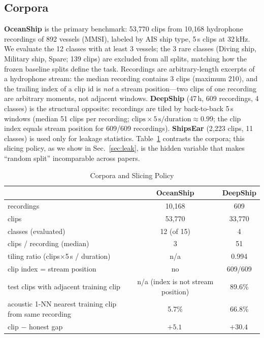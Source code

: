 ﻿\documentclass[journal]{IEEEtran}
\newcommand{\pp}{\,\text{pp}}
\begin{document}
\subsection{Corpora}
\textbf{OceanShip} \cite{oceanship} is the primary benchmark: 53{,}770 clips from 10{,}168
hydrophone recordings of 892 vessels (MMSI), labeled by AIS ship type, 5\,s clips at 32\,kHz. We
evaluate the 12 classes with at least 3 vessels; the 3 rare classes (Diving ship, Military ship,
Spare; 139 clips) are excluded from all splits, matching how the frozen baseline splits define the
task. Recordings are arbitrary-length excerpts of a hydrophone stream: the median recording
contains 3 clips (maximum 210), and the trailing index of a clip id is \emph{not} a stream
position---two clips of one recording are arbitrary moments, not adjacent windows.
\textbf{DeepShip} \cite{deepship} (47\,h, 609 recordings, 4 classes) is the structural opposite:
recordings are tiled by back-to-back 5\,s windows (median 51 clips per recording;
$\text{clips}\times5\,\text{s}/\text{duration}\approx0.99$; the clip index equals stream position
for 609/609 recordings). \textbf{ShipsEar} \cite{shipsear} (2{,}223 clips, 11 classes) is used only
for leakage statistics. Table~\ref{tab:corpora} contrasts the corpora; this slicing policy, as we
show in Sec.~\ref{sec:leak}, is the hidden variable that makes ``random split'' incomparable
across papers.

\begin{table}[!t]
\caption{Corpora and Slicing Policy}
\label{tab:corpora}
\centering
\footnotesize\setlength{\tabcolsep}{3.2pt}
\begin{tabular}{lcc}
\toprule
 & OceanShip & DeepShip \\
\midrule
recordings                 & 10{,}168 & 609 \\
clips                      & 53{,}770 & 33{,}770 \\
classes (evaluated)        & 12 (of 15) & 4 \\
clips / recording (median) & 3        & 51 \\
tiling ratio (clips$\times$5\,s / duration) & n/a & 0.994 \\
clip index = stream position & no & 609/609 \\
test clips with adjacent training clip & n/a (index is not stream position) & 89.6\% \\
acoustic 1-NN nearest training clip from same recording & 5.7\% & 66.8\% \\
clip $-$ honest gap        & $+5.1$\pp & $+30.4$\pp \\
\bottomrule
\end{tabular}
\end{table}
\end{document}
